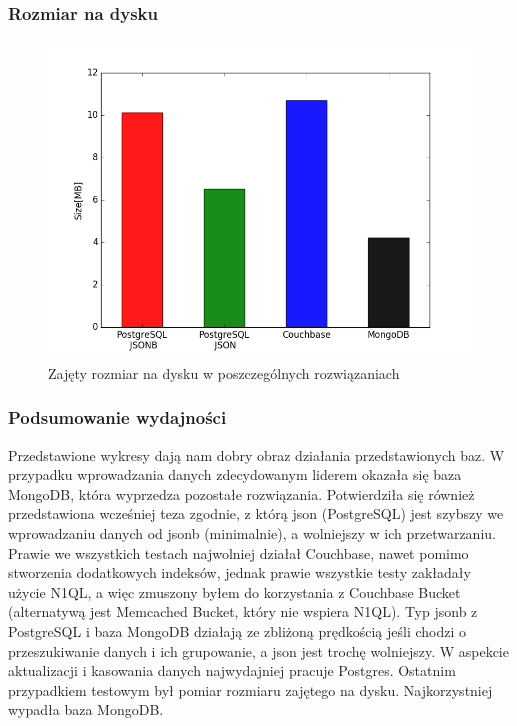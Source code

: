 \documentclass[a4paper,12pt,table]{article}
\begin{document}
{\subsubsection{Rozmiar na dysku}
\begin{figure}[h]
\begin{center}
\includegraphics[scale=0.6]{ax/fig7}
\end{center}
\caption{Zajęty rozmiar na dysku w poszczególnych rozwiązaniach}
\end{figure}

\setlength{\parskip}{1.5\bigskipamount plus \smallskipamount minus \smallskipamount}
\newpage
\subsubsection{Podsumowanie wydajności}
Przedstawione wykresy dają nam dobry obraz działania przedstawionych baz. W przypadku wprowadzania danych zdecydowanym liderem okazała się baza MongoDB, która wyprzedza pozostałe rozwiązania. Potwierdziła się również przedstawiona wcześniej teza zgodnie, z którą json (PostgreSQL) jest szybszy we wprowadzaniu danych od jsonb (minimalnie), a wolniejszy w ich przetwarzaniu. Prawie we wszystkich testach najwolniej działał Couchbase, nawet pomimo stworzenia dodatkowych indeksów, jednak prawie wszystkie testy zakładały użycie N1QL, a więc zmuszony byłem do korzystania z Couchbase Bucket (alternatywą jest Memcached Bucket, który nie wspiera N1QL). Typ jsonb z PostgreSQL i baza MongoDB działają ze zbliżoną prędkością jeśli chodzi o przeszukiwanie danych i ich grupowanie, a json jest trochę wolniejszy. W aspekcie aktualizacji i kasowania danych najwydajniej pracuje Postgres. Ostatnim przypadkiem testowym był pomiar rozmiaru zajętego na dysku. Najkorzystniej wypadła baza MongoDB.

}
\end{document}
